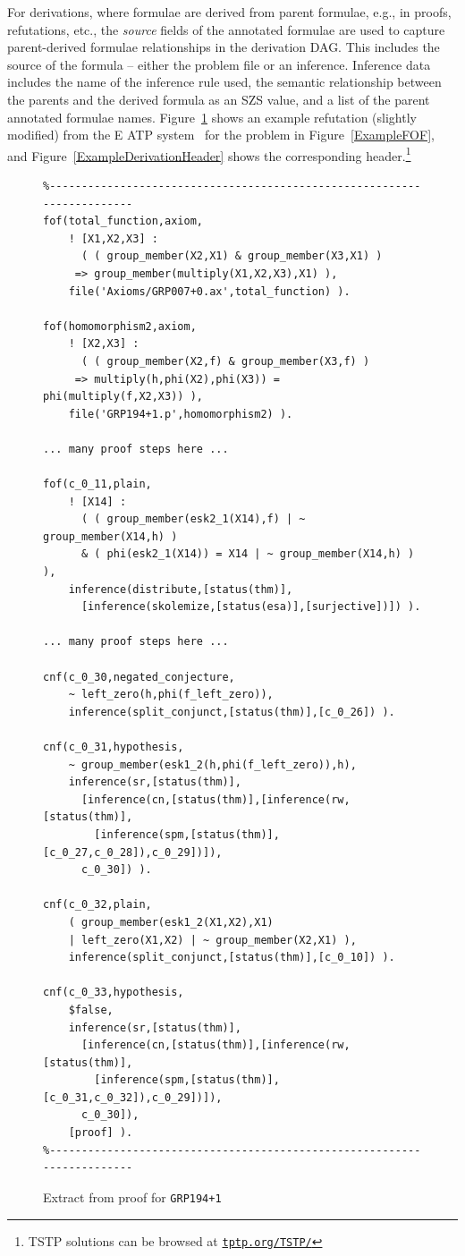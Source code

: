 \documentclass[runningheads]{llncs}
\begin{document}
For derivations, where formulae are derived from parent formulae, e.g., in proofs, refutations, 
etc., the {\em source} fields of the annotated formulae are used to capture parent-derived 
formulae relationships in the derivation DAG.
This includes the source of the formula -- either the problem file or an inference.
Inference data includes the name of the inference rule used, the semantic relationship between 
the parents and the derived formula as an SZS value, and a list of the parent annotated formulae 
names.
Figure~\ref{ExampleDerivationFormulae} shows an example refutation (slightly modified) from 
the E ATP system~\cite{SCV19} for the problem in Figure~\ref{ExampleFOF}, and 
Figure~\ref{ExampleDerivationHeader} shows the corresponding header.\footnote{%
TSTP solutions can be browsed at \href{https://tptp.org/TSTP/}{{\tt tptp.org/TSTP/}}}

\begin{figure}[h!]
\centering
{\footnotesize
{\setlength{\baselineskip}{3mm}
\begin{verbatim}
%------------------------------------------------------------------------
fof(total_function,axiom,
    ! [X1,X2,X3] :
      ( ( group_member(X2,X1) & group_member(X3,X1) )
     => group_member(multiply(X1,X2,X3),X1) ),
    file('Axioms/GRP007+0.ax',total_function) ).

fof(homomorphism2,axiom,
    ! [X2,X3] :
      ( ( group_member(X2,f) & group_member(X3,f) )
     => multiply(h,phi(X2),phi(X3)) = phi(multiply(f,X2,X3)) ),
    file('GRP194+1.p',homomorphism2) ).

... many proof steps here ...

fof(c_0_11,plain,
    ! [X14] :
      ( ( group_member(esk2_1(X14),f) | ~ group_member(X14,h) )
      & ( phi(esk2_1(X14)) = X14 | ~ group_member(X14,h) ) ),
    inference(distribute,[status(thm)],
      [inference(skolemize,[status(esa)],[surjective])]) ).

... many proof steps here ...

cnf(c_0_30,negated_conjecture,
    ~ left_zero(h,phi(f_left_zero)),
    inference(split_conjunct,[status(thm)],[c_0_26]) ).

cnf(c_0_31,hypothesis,
    ~ group_member(esk1_2(h,phi(f_left_zero)),h),
    inference(sr,[status(thm)],
      [inference(cn,[status(thm)],[inference(rw,[status(thm)],
        [inference(spm,[status(thm)],[c_0_27,c_0_28]),c_0_29])]),
      c_0_30]) ).

cnf(c_0_32,plain,
    ( group_member(esk1_2(X1,X2),X1)
    | left_zero(X1,X2) | ~ group_member(X2,X1) ),
    inference(split_conjunct,[status(thm)],[c_0_10]) ).

cnf(c_0_33,hypothesis,
    $false,
    inference(sr,[status(thm)],
      [inference(cn,[status(thm)],[inference(rw,[status(thm)],
        [inference(spm,[status(thm)],[c_0_31,c_0_32]),c_0_29])]),
      c_0_30]),
    [proof] ).
%------------------------------------------------------------------------
\end{verbatim}
}}
\caption{Extract from proof for {\tt GRP194+1}}
\label{ExampleDerivationFormulae}
\end{figure}
\end{document}
